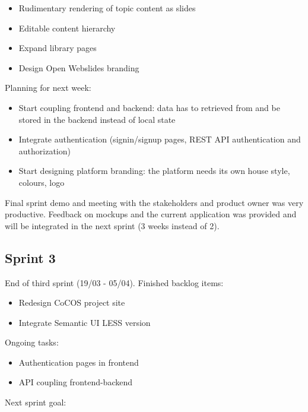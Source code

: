 \documentclass[10pt,a4paper]{article}
\begin{document}
\begin{appendices}
{        \begin{itemize}
          \item Rudimentary rendering of topic content as slides
          \item Editable content hierarchy
          \item Expand library pages
          \item Design Open Webslides branding
        \end{itemize}

        Planning for next week:

        \begin{itemize}
          \item Start coupling frontend and backend: data has to retrieved from and be stored in the backend instead of local state
          \item Integrate authentication (signin/signup pages, REST API authentication and authorization)
          \item Start designing platform branding: the platform needs its own house style, colours, logo
        \end{itemize}

        Final sprint demo and meeting with the stakeholders and product owner was very productive.
        Feedback on mockups and the current application was provided and will be integrated in the next sprint (3 weeks instead of 2).

      \subsection*{Sprint 3}
        End of third sprint (19/03 - 05/04).
        Finished backlog items:

        \begin{itemize}
          \item Redesign CoCOS project site
          \item Integrate Semantic UI LESS version
        \end{itemize}

        Ongoing tasks:

        \begin{itemize}
          \item Authentication pages in frontend
          \item API coupling frontend-backend
        \end{itemize}

        Next sprint goal:

}
\end{appendices}
\end{document}
